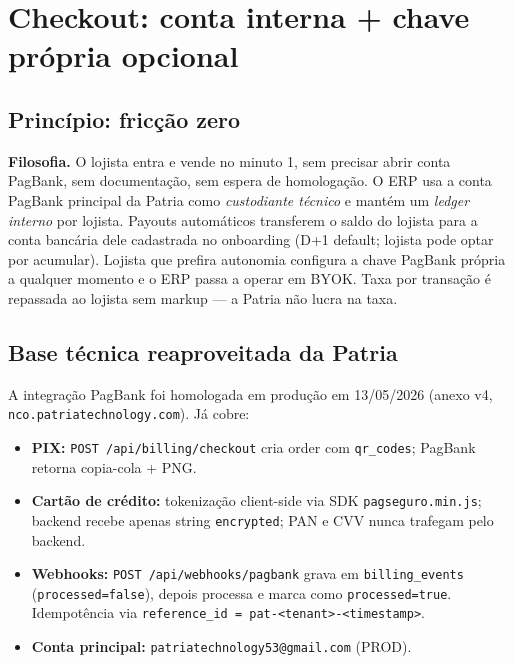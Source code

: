 \documentclass[11pt,a4paper]{article}
\begin{document}
\section{Checkout: conta interna + chave própria opcional}

\subsection{Princípio: fricção zero}

\begin{notice}
\textbf{Filosofia.} O lojista entra e vende no minuto 1, sem precisar
abrir conta PagBank, sem documentação, sem espera de homologação. O ERP
usa a conta PagBank principal da Patria como \emph{custodiante técnico} e
mantém um \emph{ledger interno} por lojista. Payouts automáticos
transferem o saldo do lojista para a conta bancária dele cadastrada no
onboarding (D+1 default; lojista pode optar por acumular). Lojista que
prefira autonomia configura a chave PagBank própria a qualquer momento e
o ERP passa a operar em BYOK. Taxa por transação é repassada ao lojista
sem markup --- a Patria não lucra na taxa.
\end{notice}

\subsection{Base técnica reaproveitada da Patria}

A integração PagBank foi homologada em produção em 13/05/2026 (anexo v4,
\texttt{nco.patriatechnology.com}). Já cobre:

\begin{itemize}[leftmargin=2em]
  \item \textbf{PIX:} \texttt{POST /api/billing/checkout} cria order com
        \texttt{qr\_codes}; PagBank retorna copia-cola + PNG.
  \item \textbf{Cartão de crédito:} tokenização client-side via SDK
        \texttt{pagseguro.min.js}; backend recebe apenas string
        \texttt{encrypted}; PAN e CVV nunca trafegam pelo backend.
  \item \textbf{Webhooks:} \texttt{POST /api/webhooks/pagbank} grava em
        \texttt{billing\_events} (\texttt{processed=false}), depois processa
        e marca como \texttt{processed=true}. Idempotência via
        \texttt{reference\_id = pat-<tenant>-<timestamp>}.
  \item \textbf{Conta principal:} \texttt{patriatechnology53@gmail.com}
        (PROD).
\end{itemize}
\end{document}
